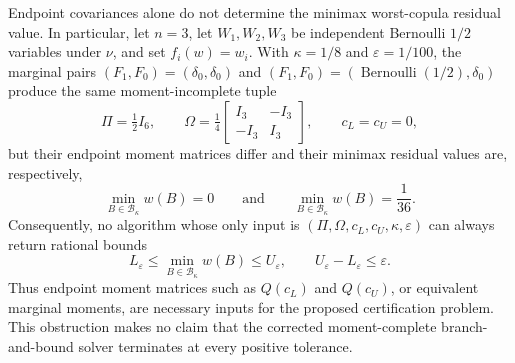Endpoint covariances alone do not determine the minimax worst-copula residual value.  In particular, let \(n=3\), let \(W_1,W_2,W_3\) be independent Bernoulli \(1/2\) variables under \(\nu\), and set \(f_i(w)=w_i\).  With \(\kappa=1/8\) and \(\varepsilon=1/100\), the marginal pairs \((F_1,F_0)=(\delta_0,\delta_0)\) and \((F_1,F_0)=(\operatorname{Bernoulli}(1/2),\delta_0)\) produce the same moment-incomplete tuple
\[
\Pi=\tfrac12 I_6,\qquad
\Omega=\tfrac14\begin{bmatrix}I_3&-I_3\\-I_3&I_3\end{bmatrix},
\qquad c_L=c_U=0,
\]
but their endpoint moment matrices differ and their minimax residual values are, respectively,
\[
\min_{B\in\mathcal B_\kappa}w(B)=0
\qquad\text{and}\qquad
\min_{B\in\mathcal B_\kappa}w(B)=\frac1{36}.
\]
Consequently, no algorithm whose only input is \((\Pi,\Omega,c_L,c_U,\kappa,\varepsilon)\) can always return rational bounds
\[
L_{\varepsilon}\le \min_{B\in\mathcal B_\kappa}w(B)\le U_{\varepsilon},
\qquad U_{\varepsilon}-L_{\varepsilon}\le\varepsilon.
\]
Thus endpoint moment matrices such as \(Q(c_L)\) and \(Q(c_U)\), or equivalent marginal moments, are necessary inputs for the proposed certification problem.  This obstruction makes no claim that the corrected moment-complete branch-and-bound solver terminates at every positive tolerance.